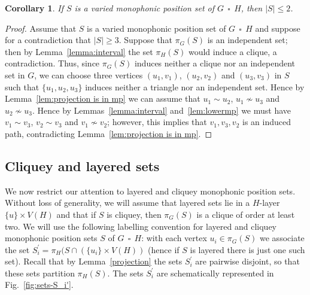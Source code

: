 \documentclass[12pt]{article}
\newtheorem{corollary}[theorem]{Corollary}
\DeclareMathOperator{\cp}{\,\square\,}
\begin{document}
\begin{corollary}\label{cor:varied sets are small}
If $S$ is a varied monophonic position set of $G \cp H$, then $|S| \leq 2$.
\end{corollary}

\begin{proof}
Assume that $S$ is a varied monophonic position set of $G \cp H$ and suppose for a contradiction that $|S| \geq 3 $. Suppose that $\pi _G(S)$ is an independent set; then by Lemma~\ref{lemma:interval} the set $\pi _H(S)$ would induce a clique, a contradiction. Thus, since $\pi _G(S)$ induces neither a clique nor an independent set in $G$, we can choose three vertices $(u_1,v_1)$, $(u_2,v_2)$ and $(u_3,v_3)$ in $S$ such that $\{ u_1,u_2,u_3\} $ induces neither a triangle nor an independent set. Hence by Lemma~\ref{lem:projection is in mp} we can assume that $u_1 \sim u_2$, $u_1 \not \sim u_3$ and $u_2 \not \sim u_3$. Hence by Lemmas~\ref{lemma:interval} and~\ref{lem:lowermp} we must have $v_1 \sim v_3$, $v_2 \sim v_3$ and $v_1 \not \sim v_2$; however, this implies that $v_1,v_3,v_2$ is an induced path, contradicting Lemma~\ref{lem:projection is in mp}.  

\end{proof}

\subsection{Cliquey and layered sets}

We now restrict our attention to layered and cliquey monophonic position sets. Without loss of generality, we will assume that layered sets lie in a $H$-layer $\{ u\} \times V(H)$ and that if $S$ is cliquey, then $\pi _G(S)$ is a clique of order at least two. We will use the following labelling convention for layered and cliquey monophonic position sets $S$ of $G \cp H$: with each vertex $u_i \in \pi _G(S)$ we associate the set $S_i^{\prime } = \pi _H(S \cap (\{ u_i\} \times V(H))$ (hence if $S$ is layered there is just one such set). Recall that by Lemma~\ref{projection} the sets $S_i^{\prime }$ are pairwise disjoint, so that these sets partition $\pi _H(S)$. The sets $S_i^{\prime}$ are schematically represented in Fig.~\ref{fig:sets-S_i'}.
\end{document}
